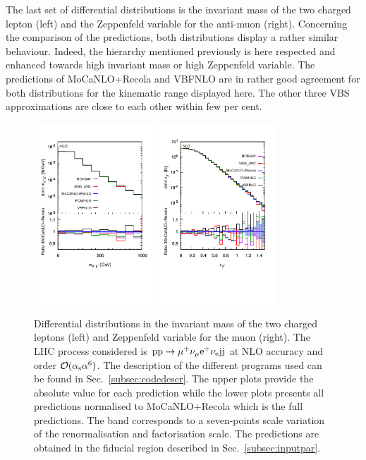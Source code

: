 The last set of differential distributions is the invariant mass of the two charged lepton (left) and the Zeppenfeld variable for the anti-muon (right).
Concerning the comparison of the predictions, both distributions display a rather similar behaviour.
Indeed, the hierarchy mentioned previously is here respected and enhanced towards high invariant mass or high Zeppenfeld variable.
The predictions of {\sc MoCaNLO}+{\sc Recola} and {\sc VBFNLO} are in rather good agreement for both distributions for the kinematic range displayed here.
The other three VBS approximations are close to each other within few per cent.

 \begin{figure}[hbt!]
   \centering
   \includegraphics[width=0.4\textwidth,angle=0,clip=true,trim={0.4cm 2cm 0.cm 1.cm}]{figures/NLO/mll_NLO.pdf}
   \includegraphics[width=0.4\textwidth,angle=0,clip=true,trim={0.4cm 2cm 0.cm 1.cm}]{figures/NLO/zmu_NLO.pdf}
\caption{\label{fig:distNLO3} Differential distributions in the invariant mass of the two charged leptons (left) and Zeppenfeld variable for the muon (right).
The LHC process considered is ${\rm p}{\rm p}\to\mu^+\nu_\mu{\rm e}^+\nu_{\rm e}{\rm j}{\rm j}$ at NLO accuracy and order $\mathcal{O}(\alpha_{\rm s}\alpha^6)$.
The description of the different programs used can be found in Sec.~\ref{subsec:codedescr}.
The upper plots provide the absolute value for each prediction while the lower plots presents all predictions normalised to {\sc MoCaNLO}+{\sc Recola} which is the full predictions.
The band corresponds to a seven-points scale variation of the renormalisation and factorisation scale.
The predictions are obtained in the fiducial region described in Sec.~\ref{subsec:inputpar}.
}
\end{figure}

